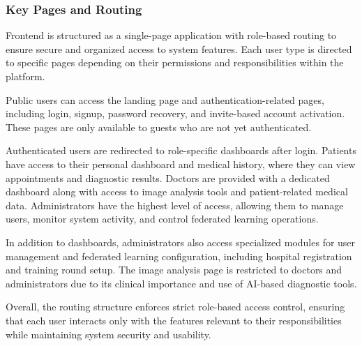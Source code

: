 \subsubsection{Key Pages and Routing}
Frontend is structured as a single-page application with role-based routing to ensure secure and organized access to system features. Each user type is directed to specific pages depending on their permissions and responsibilities within the platform.

Public users can access the landing page and authentication-related pages, including login, signup, password recovery, and invite-based account activation. These pages are only available to guests who are not yet authenticated.

Authenticated users are redirected to role-specific dashboards after login. Patients have access to their personal dashboard and medical history, where they can view appointments and diagnostic results. Doctors are provided with a dedicated dashboard along with access to image analysis tools and patient-related medical data. Administrators have the highest level of access, allowing them to manage users, monitor system activity, and control federated learning operations.

In addition to dashboards, administrators also access specialized modules for user management and federated learning configuration, including hospital registration and training round setup. The image analysis page is restricted to doctors and administrators due to its clinical importance and use of AI-based diagnostic tools.

Overall, the routing structure enforces strict role-based access control, ensuring that each user interacts only with the features relevant to their responsibilities while maintaining system security and usability.

